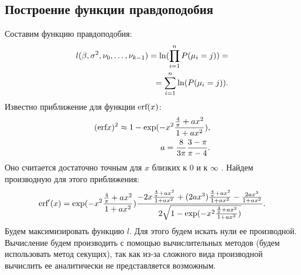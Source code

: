 \documentclass[a4paper,14pt]{extarticle}
\begin{document}
\subsection{Построение функции правдоподобия}\label{sec4_1}
Составим функцию правдоподобия:
\begin{eqnarray}
    \label{eq22}l(\beta,\sigma^2, \nu_0,\dots, \nu_{k-1})=\textup{ln}(\prod_{i=1}^{n}P(\mu_i=j))=\\
    \label{eq23}=\sum_{i=1}^{n}\ln(P(\mu_i=j)).
\end{eqnarray}
Известно приближение для функции $\textup{erf}(x)$:
\begin{eqnarray}
    \label{eq24}(\textup{erf} x)^2\approx 1- \exp(-x^2 \frac{\frac{4}{\pi}+ax^2}{1+ax^2}),\\
    a=\frac{8}{3\pi}\frac{3-\pi}{\pi -4}.
\end{eqnarray}
Оно считается достаточно точным для $x$ близких к $0$ и к $\infty$ \cite{Winitzki}. \hfill\break
Найдем производную для этого приближения:
\begin{eqnarray}
    \label{eq26}\textup{erf}'(x) = \exp(-x^2 \frac{\frac{4}{\pi}+ax^2}{1+ax^2}) \frac{-2x\frac{\frac{4}{\pi}+ax^2}{1+ax^2}+(2ax^3)\frac{\frac{4}{\pi}+ax^2}{1+ax^2}-\frac{2ax^3}{1+ax^2}}{2\sqrt{1- \exp(-x^2 \frac{\frac{4}{\pi}+ax^2}{1+ax^2})}}.
\end{eqnarray}
Будем максимизировать функцию $l$.
Для этого будем искать нули ее производной. Вычисление будем производить с помощью вычислительных методов (будем использовать метод секущих), так как из-за сложного вида производной вычислить ее аналитически не представляется возможным.
\end{document}
